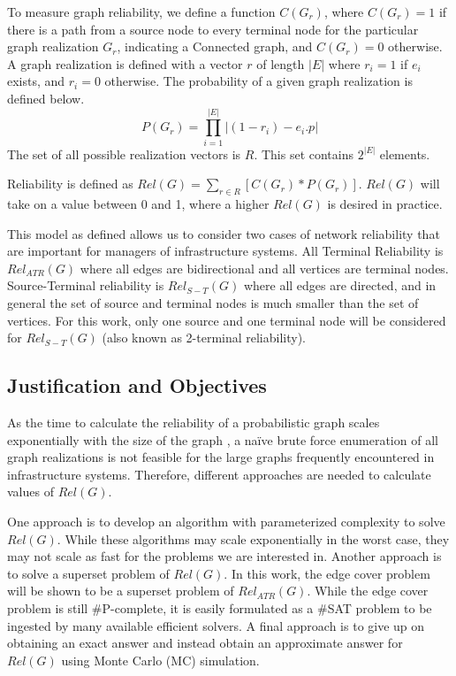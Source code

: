 \documentclass[12pt,twocolumn]{article}
\begin{document}
To measure graph reliability, we define a function \(C(G_r)\), where \(C(G_r)=1\) if there is a path from a source node to every terminal node for the particular graph realization \(G_r\), indicating a Connected graph, and \(C(G_r)=0\) otherwise. A graph realization is defined with a vector \(r\) of length \(|E|\) where \(r_i=1\) if \(e_i\) exists, and \(r_i=0\) otherwise. The probability of a given graph realization is defined below. \[P(G_r) = \prod_{i=1}^{|E|} |(1-r_i)-e_i.p|\] The set of all possible realization vectors is \(R\). This set contains \(2^{|E|}\) elements.

Reliability is defined as \(Rel(G) = \sum_{r \in R} [C(G_r)*P(G_r)]\). \(Rel(G)\) will take on a value between 0 and 1, where a higher \(Rel(G)\) is desired in practice.

This model as defined allows us to consider two cases of network reliability that are important for managers of infrastructure systems. All Terminal Reliability is \(Rel_{ATR}(G)\) where all edges are bidirectional and all vertices are terminal nodes. Source-Terminal reliability is \(Rel_{S-T}(G)\) where all edges are directed, and in general the set of source and terminal nodes is much smaller than the set of vertices. For this work, only one source and one terminal node will be considered for \(Rel_{S-T}(G)\) (also known as 2-terminal reliability).

\hypertarget{justification-and-objectives}{%
\subsection{Justification and Objectives}\label{justification-and-objectives}}

As the time to calculate the reliability of a probabilistic graph scales exponentially with the size of the graph \cite{valiant1979complexity}, a naïve brute force enumeration of all graph realizations is not feasible for the large graphs frequently encountered in infrastructure systems. Therefore, different approaches are needed to calculate values of \(Rel(G)\).

One approach is to develop an algorithm with parameterized complexity to solve \(Rel(G)\). While these algorithms may scale exponentially in the worst case, they may not scale as fast for the problems we are interested in. Another approach is to solve a superset problem of \(Rel(G)\). In this work, the edge cover problem will be shown to be a superset problem of \(Rel_{ATR}(G)\). While the edge cover problem is still \#P-complete, it is easily formulated as a \#SAT problem to be ingested by many available efficient solvers. A final approach is to give up on obtaining an exact answer and instead obtain an approximate answer for \(Rel(G)\) using Monte Carlo (MC) simulation.
\end{document}
